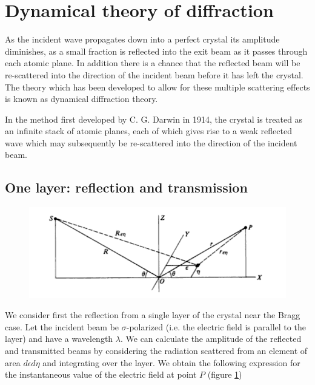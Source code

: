 \documentclass[12pt,oneside,notitlepage,abstracton,a4paper]{scrartcl}
\begin{document}
\section{Dynamical theory of diffraction}
As the incident wave propagates down into a perfect crystal its amplitude diminishes, as a small fraction is reflected into the exit beam as it passes through each atomic plane. In addition there is a chance that the reflected beam will be re-scattered into the direction of the incident beam before it has left the crystal. The theory which has been developed to allow for these multiple scattering effects is known as dynamical diffraction theory.

In the method first developed by C. G. Darwin in 1914, the crystal is treated as an infinite stack of atomic planes, each of which gives rise to a weak reflected wave which may subsequently be re-scattered into the direction of the incident beam.


\subsection{One layer: reflection and transmission}\label{onelayer}

\begin{figure}[h]
\begin{center}
\includegraphics[width=12cm]{pics/picture1.png}
\caption{}
\label{pic1}
\end{center}
\end{figure}

We consider first the reflection from a single layer of the crystal near the Bragg case. Let the incident beam be $\sigma$-polarized (i.e. the electric field is parallel to the layer) and have a wavelength $\lambda$. We can calculate the amplitude of the reflected and transmitted beams by considering the radiation scattered from an element of area $d\epsilon d\eta$ and integrating over the layer. We obtain the following expression for the instantaneous value of the electric field at point $P$ (figure \ref{pic1})
\end{document}
